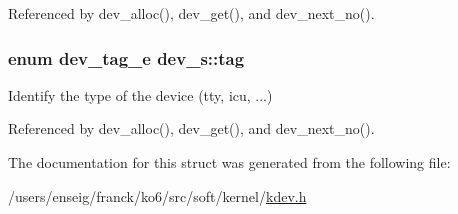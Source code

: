 Referenced by dev\-\_\-alloc(), dev\-\_\-get(), and dev\-\_\-next\-\_\-no().

\hypertarget{structdev__s_addb9b18666e781df02b2a7f2c8889b2b}{
\subsubsection[{tag}]{\setlength{\rightskip}{0pt plus 5cm}enum {\bf dev\-\_\-tag\-\_\-e} dev\-\_\-s\-::tag}}\label{structdev__s_addb9b18666e781df02b2a7f2c8889b2b}


Identify the type of the device (tty, icu, ...) 



Referenced by dev\-\_\-alloc(), dev\-\_\-get(), and dev\-\_\-next\-\_\-no().



The documentation for this struct was generated from the following file\-:\begin{DoxyCompactItemize}
\item 
/users/enseig/franck/ko6/src/soft/kernel/\hyperlink{kdev_8h}{kdev.\-h}\end{DoxyCompactItemize}
